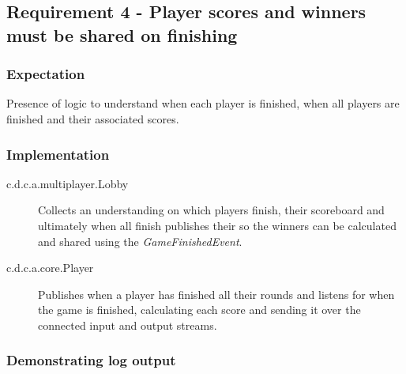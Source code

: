 \subsection{Requirement 4 - Player scores and winners must be shared on finishing} 

\subsubsection{Expectation} 
Presence of logic to understand when each player is finished, when all players are finished and their associated scores.

\subsubsection{Implementation}

\begin{description}
	\item[c.d.c.a.multiplayer.Lobby] Collects an understanding on which players finish, their scoreboard and ultimately when all finish publishes their so the winners can be calculated and shared using the \textit{GameFinishedEvent}.
	
	\item[c.d.c.a.core.Player] Publishes when a player has finished all their rounds and listens for when the game is finished, calculating each score and sending it over the connected input and output streams.
	
\end{description} 

\subsubsection{Demonstrating log output} 



 
